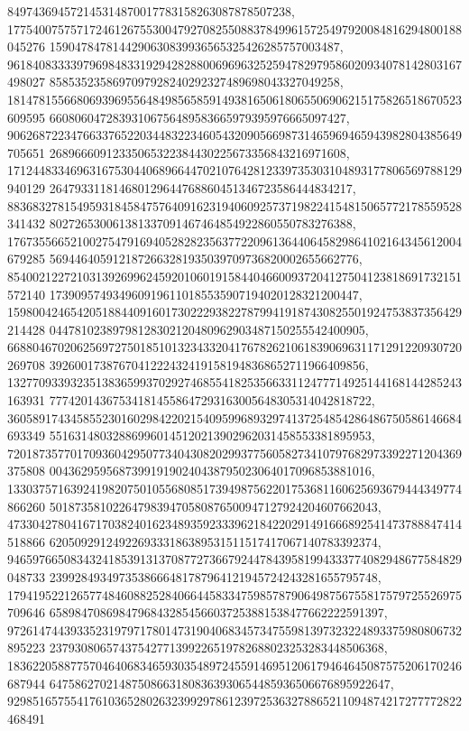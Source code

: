 \documentclass[12pt]{article}
\begin{document}
849743694572145314870017783158263087878507238, 
177540075757172461267553004792708255088378499615725497920084816294800188045276
1590478478144290630839936565325426285757003487, 
961840833339796984833192942828800696963252594782979586020934078142803167498027
8585352358697097928240292327489698043327049258, 
181478155668069396955648498565859149381650618065506906215175826518670523609595
66080604728393106756489583665979395976665097427, 
906268722347663376522034483223460543209056698731465969465943982804385649705651
26896660912335065322384430225673356843216971608, 
171244833469631675304406896644702107642812339735303104893177806569788129940129
264793311814680129644768860451346723586444834217, 
883683278154959318458475764091623194060925737198224154815065772178559528341432
802726530061381337091467464854922860550783276388, 
176735566521002754791694052828235637722096136440645829864102164345612004679285
5694464059121872663281935039709736820002655662776, 
854002122721031392699624592010601915844046600937204127504123818691732151572140
1739095749349609196110185535907194020128321200447, 
159800424654205188440916017302229382278799419187430825501924753837356429214428
04478102389798128302120480962903487150255542400905, 
668804670206256972750185101323433204176782621061839069631171291220930720269708
39260017387670412224324191581948368652711966409856, 
132770933932351383659937029274685541825356633112477714925144168144285243163931
777420143675341814558647293163005648305314042818722, 
360589174345855230160298422021540959968932974137254854286486750586146684693349
551631480328869960145120213902962031458553381895953, 
720187357701709360429507734043082029937756058273410797682973392271204369375808
004362959568739919190240438795023064017096853881016, 
133037571639241982075010556808517394987562201753681160625693679444349774866260
5018735810226479839470580876500947127924204607662043, 
473304278041671703824016234893592333962184220291491666892541473788847414518866
6205092912492269333186389531511517417067140783392374, 
946597665083432418539131370877273667924478439581994333774082948677584829048733
2399284934973538666481787964121945724243281655795748, 
179419522126577484608825284066445833475985787906498756755817579725526975709646
65898470869847968432854566037253881538477662222591397, 
972614744393352319797178014731904068345734755981397323224893375980806732895223
23793080657437542771399226519782688023253283448506368, 
183622058877570464068346593035489724559146951206179464645087575206170246687944
647586270214875086631808363930654485936506676895922647, 
929851657554176103652802632399297861239725363278865211094874217277772822468491
\end{document}
